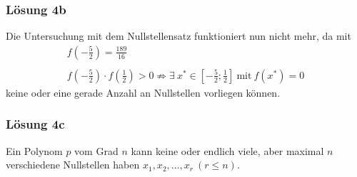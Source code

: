 \documentclass[main.tex]{subfiles}
\begin{document}
\subsubsection{Lösung 4b}
Die Untersuchung mit dem Nullstellensatz funktioniert nun nicht mehr, da mit
\begin{gather*}
    f\left( -\frac{5}{2}\right) =\frac{189}{16}\\
    \\
    f\left( -\frac{5}{2}\right) \cdot f\left(\frac{1}{2}\right)  >0\nRightarrow \exists \ x^{*} \in \left[ -\frac{5}{2} ;\frac{1}{2}\right] \ \text{mit} \ f\left( x^{*}\right) =0
\end{gather*}
keine oder eine gerade Anzahl an Nullstellen vorliegen können.

\subsubsection{Lösung 4c}
Ein Polynom $p$ vom Grad $n$ kann keine oder endlich viele, aber maximal $n$ verschiedene Nullstellen haben $x_1,x_2,\ldots, x_r\ (r \leq n)$.
\end{document}
